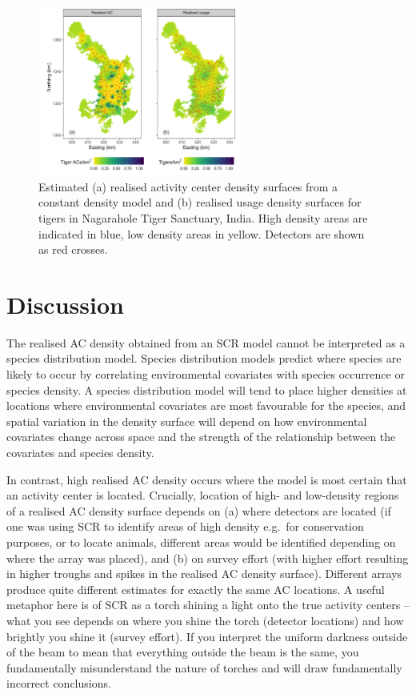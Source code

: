 \documentclass[10pt,a4paper]{article}
\begin{document}
\begin{figure}[htbp]
\centering
\includegraphics[width=0.6\textwidth]{tiger_spaceuse.png}
\caption{Estimated (a) realised activity center density surfaces from a constant density model and (b) realised usage density surfaces for tigers in Nagarahole Tiger Sanctuary, India. High density areas are indicated in blue, low density areas in yellow. Detectors are shown as red crosses.}
\label{tigerspaceuse}
\end{figure}


\section{Discussion} \label{discussion}
The realised AC density obtained from an SCR model cannot be interpreted as a species distribution model. Species distribution models predict where species are likely to occur by correlating environmental covariates with species occurrence or species density. %
A species distribution model will tend to place higher densities at locations where environmental covariates are most favourable for the species, and spatial variation in the density surface will depend on how environmental covariates change across space and the strength of the relationship between the covariates and species density.

In contrast, high realised AC density occurs where the model is most certain that an activity center is located. Crucially, location of high- and low-density regions of a realised AC density surface depends on (a) where detectors are located (if one was using SCR to identify areas of high density e.g.\ for conservation purposes, or to locate animals, different areas would be identified depending on where the array was placed), and (b) on survey effort (with higher effort resulting in higher troughs and spikes in the realised AC density surface). Different arrays produce quite different estimates for exactly the same AC locations. A useful metaphor here is of SCR as a torch shining a light onto the true activity centers -- what you see depends on where you shine the torch (detector locations) and how brightly you shine it (survey effort). If you interpret the uniform darkness outside of the beam to mean that everything outside the beam is the same, you fundamentally misunderstand the nature of torches and will draw fundamentally incorrect conclusions.
\end{document}
